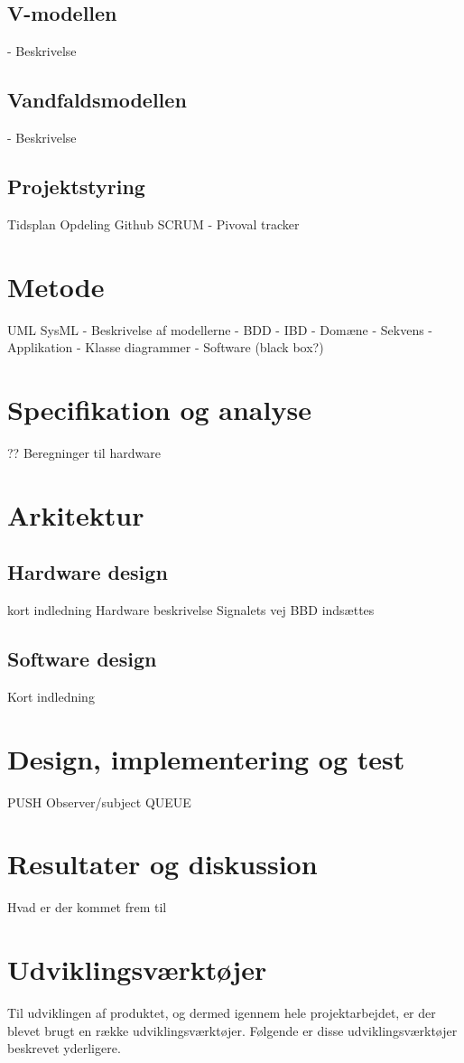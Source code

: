 \subsection{V-modellen}
- Beskrivelse
\subsection{Vandfaldsmodellen}
- Beskrivelse
\subsection{Projektstyring}
Tidsplan
Opdeling
Github
SCRUM
- Pivoval tracker
\section{Metode}
UML
SysML
- Beskrivelse af modellerne
	- BDD
	- IBD
	- Domæne
	- Sekvens
	- Applikation
	- Klasse diagrammer
	- Software (black box?)
	
	
	
	\section{Specifikation og analyse}
	??
	Beregninger til hardware
	\section{Arkitektur}
	\subsection{Hardware design}
	kort indledning
	Hardware beskrivelse
	Signalets vej
	BBD indsættes
	\subsection{Software design}
	Kort indledning
	\section{Design, implementering og test}
	PUSH
	Observer/subject
	QUEUE
	
	
	
	
\section{Resultater og diskussion}
Hvad er der kommet frem til
\section{Udviklingsværktøjer}
Til udviklingen af produktet, og dermed igennem hele projektarbejdet, er der blevet brugt en række udviklingsværktøjer. Følgende er disse udviklingsværktøjer beskrevet yderligere.
